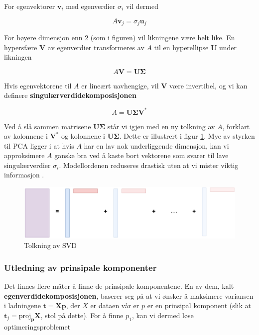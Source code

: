 For egenvektorer $\mathbf{v}_i$ med egenverdier $\sigma_i$ vil dermed

\begin{equation}
	A \mathbf{v}_j = \sigma_j \mathbf{u}_j
\end{equation}

For høyere dimensjon enn 2 (som i figuren) vil likningene være helt like. En hypersfære $\mathbf{V}$ av egenverdier transformeres av $A$ til en hyperellipse $\mathbf{U}$ under likningen

\begin{equation}
	A \mathbf{V} =\mathbf{U} \mathbf{\Sigma}
\end{equation}

Hvis egenvektorene til $A$ er lineært uavhengige, vil $\mathbf{V}$ være invertibel, og vi kan definere \textbf{singulærverdidekomposisjonen}

\begin{equation}
	A  =\mathbf{U} \mathbf{\Sigma} \mathbf{V}^*
\end{equation}

Ved å slå sammen matrisene $\mathbf{U} \mathbf{\Sigma}$ står vi igjen med en ny tolkning av $A$, forklart av kolonnene i $\mathbf{V}^*$ og kolonnene i $\mathbf{U} \mathbf{\Sigma}$. Dette er illustrert i figur \ref{fig:pca_komponentvis}. Mye av styrken til PCA ligger i at hvis $A$ har en lav nok underliggende dimensjon, kan vi approksimere $A$ ganske bra ved å kaste bort vektorene som svarer til lave singulærverdier $\sigma_i$. Modellordenen reduseres drastisk uten at vi mister viktig informasjon \Cooley.

\begin{figure}[h]
	\centering
	\includegraphics[width=\textwidth]{figurer/pca_komponentvis}
	\caption{Tolkning av SVD}
	\label{fig:pca_komponentvis}
\end{figure}

\subsubsection{Utledning av prinsipale komponenter}
Det finnes flere måter å finne de prinsipale komponentene. En av dem, kalt \textbf{egenverdidekomposisjonen}, baserer seg på at vi ønsker å maksimere variansen i ladningene $\mathbf{t} = \mathbf{Xp}$, der $X$ er dataen vår er $p$ er en prinsipal komponent (slik at $\mathbf{t}_j = \textrm{proj}_{\mathbf{p}} \mathbf{X}$, stol på dette). For å finne $p_1$, kan vi dermed løse optimeringsproblemet

